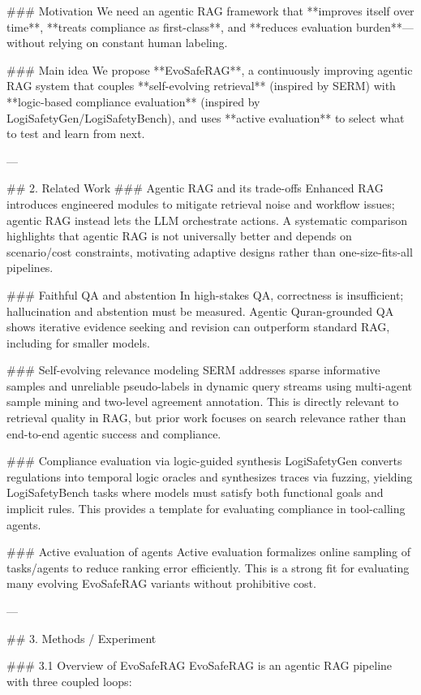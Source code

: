 ### Motivation
We need an agentic RAG framework that **improves itself over time**, **treats compliance as first-class**, and **reduces evaluation burden**—without relying on constant human labeling.

### Main idea
We propose **EvoSafeRAG**, a continuously improving agentic RAG system that couples **self-evolving retrieval** (inspired by SERM) with **logic-based compliance evaluation** (inspired by LogiSafetyGen/LogiSafetyBench), and uses **active evaluation** to select what to test and learn from next.

---

## 2. Related Work
### Agentic RAG and its trade-offs
Enhanced RAG introduces engineered modules to mitigate retrieval noise and workflow issues; agentic RAG instead lets the LLM orchestrate actions. A systematic comparison highlights that agentic RAG is not universally better and depends on scenario/cost constraints, motivating adaptive designs rather than one-size-fits-all pipelines.

### Faithful QA and abstention
In high-stakes QA, correctness is insufficient; hallucination and abstention must be measured. Agentic Quran-grounded QA shows iterative evidence seeking and revision can outperform standard RAG, including for smaller models.

### Self-evolving relevance modeling
SERM addresses sparse informative samples and unreliable pseudo-labels in dynamic query streams using multi-agent sample mining and two-level agreement annotation. This is directly relevant to retrieval quality in RAG, but prior work focuses on search relevance rather than end-to-end agentic success and compliance.

### Compliance evaluation via logic-guided synthesis
LogiSafetyGen converts regulations into temporal logic oracles and synthesizes traces via fuzzing, yielding LogiSafetyBench tasks where models must satisfy both functional goals and implicit rules. This provides a template for evaluating compliance in tool-calling agents.

### Active evaluation of agents
Active evaluation formalizes online sampling of tasks/agents to reduce ranking error efficiently. This is a strong fit for evaluating many evolving EvoSafeRAG variants without prohibitive cost.

---

## 3. Methods / Experiment

### 3.1 Overview of EvoSafeRAG
EvoSafeRAG is an agentic RAG pipeline with three coupled loops:

